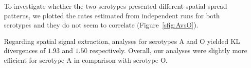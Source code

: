 \documentclass[10pt]{article}
\begin{document}
To investigate whether the two serotypes presented different spatial spread patterns, we plotted the rates estimated from independent runs for both serotypes and they do not seem to correlate (Figure~\ref{sfig:AvsO}).



Regarding spatial signal extraction, analyses for serotypes  A and O yielded KL divergences of $1.93$ and $1.50$ respectively.
Overall, our analyses were slightly more efficient for serotype A in comparison with serotype O.
\end{document}
